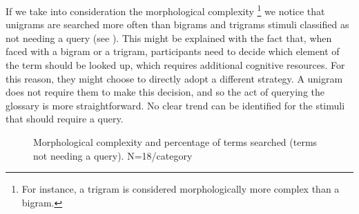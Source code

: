 \documentclass[output=paper]{langsci/langscibook}
\begin{document}
If we take into consideration the morphological complexity\textstyleannotationreference{ -} \footnote{For instance, a trigram is considered morphologically more complex than a bigram.}\textstyleannotationreference{ -} we notice that unigrams are searched more often than bigrams and trigrams  stimuli classified as not needing a query (see ). This might be explained with the fact that, when faced with a bigram or a trigram, participants need to decide which element of the term should be looked up, which requires additional cognitive resources. For this reason, they might choose to directly adopt a different strategy. A unigram does not require them to make this decision, and so the act of querying the glossary is more straightforward. No clear trend can be identified for the stimuli that should require a query.

\begin{figure}
\caption{Morphological complexity and percentage of terms searched (terms not needing a query). N=18/category \label{fig:prandi:11}}
\end{figure}
\end{document}
